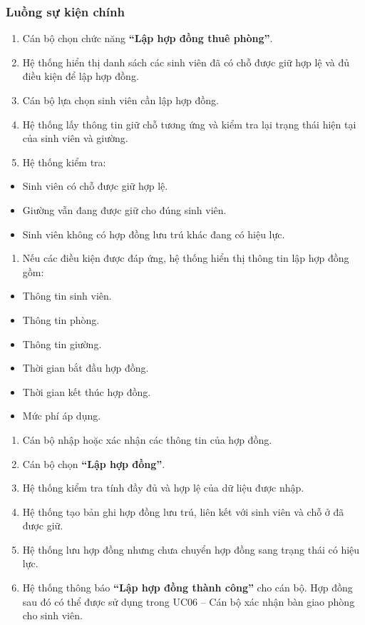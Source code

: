 \subsubsection{Luồng sự kiện chính}

\begin{enumerate}[leftmargin=1.6em]
\item Cán bộ chọn chức năng \textbf{“Lập hợp đồng thuê phòng”}.
\item Hệ thống hiển thị danh sách các sinh viên đã có chỗ được giữ hợp lệ và đủ điều kiện để lập hợp đồng.
\item Cán bộ lựa chọn sinh viên cần lập hợp đồng.
\item Hệ thống lấy thông tin giữ chỗ tương ứng và kiểm tra lại trạng thái hiện tại của sinh viên và giường.
\item Hệ thống kiểm tra:
\end{enumerate}

\begin{itemize}[leftmargin=1.4em]
\item Sinh viên có chỗ được giữ hợp lệ.
\item Giường vẫn đang được giữ cho đúng sinh viên.
\item Sinh viên không có hợp đồng lưu trú khác đang có hiệu lực.
\end{itemize}

\begin{enumerate}[leftmargin=1.6em]
\item Nếu các điều kiện được đáp ứng, hệ thống hiển thị thông tin lập hợp đồng gồm:
\end{enumerate}

\begin{itemize}[leftmargin=1.4em]
\item Thông tin sinh viên.
\item Thông tin phòng.
\item Thông tin giường.
\item Thời gian bắt đầu hợp đồng.
\item Thời gian kết thúc hợp đồng.
\item Mức phí áp dụng.
\end{itemize}

\begin{enumerate}[leftmargin=1.6em]
\item Cán bộ nhập hoặc xác nhận các thông tin của hợp đồng.
\item Cán bộ chọn \textbf{“Lập hợp đồng”}.
\item Hệ thống kiểm tra tính đầy đủ và hợp lệ của dữ liệu được nhập.
\item Hệ thống tạo bản ghi hợp đồng lưu trú, liên kết với sinh viên và chỗ ở đã được giữ.
\item Hệ thống lưu hợp đồng nhưng chưa chuyển hợp đồng sang trạng thái có hiệu lực.
\item Hệ thống thông báo \textbf{“Lập hợp đồng thành công”} cho cán bộ. Hợp đồng sau đó có thể được sử dụng trong UC06 – Cán bộ xác nhận bàn giao phòng cho sinh viên.
\end{enumerate}


